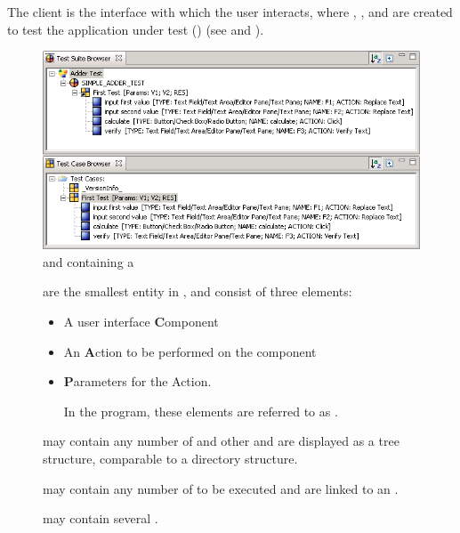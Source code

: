 
The client is the interface with which the user interacts, where 
\gdsteps{}, \gdcases{}, \gdsuites and \gdprojects are created to test the 
application under test (\gdaut{}) 
(see  and ). 

\begin{figure}[h]
\begin{center}
\includegraphics{GettingStarted/Structure/PS/testcasesandsteps}
\caption{\gdtestsuitebrowser and \gdtestcasebrowser containing a \gdcase}
\label{testcasesandsteps}
\end{center}
\end{figure}
\begin{description}
\item[\gdsteps]{ are the smallest 
entity in \GD{},  and consist of three elements:
\begin{itemize}
\item A user interface \textbf{C}omponent
\item An \textbf{A}ction to be performed on the component
\item \textbf{P}arameters for the Action.

In the program, these elements are referred to as .
\end{itemize}}


\item[\gdcases]{ may contain
 any number of  \gdsteps and other \gdcases and are
displayed as a tree structure, comparable to a directory structure.}

\item[\gdsuites]{ may contain any
 number of \gdcases to be executed and are linked to an \gdaut{}. }

\item[\gdprojects]{may contain several \gdsuites{}.}
\end{description}

